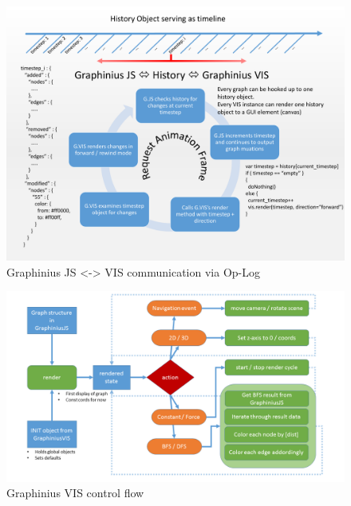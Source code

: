 	\begin{landscape}
		\begin{figure}[ht]
			\label{fig_history_workflow}
			\centering
			\vspace{-2.0cm}
			\includegraphics[width=1.6\textwidth]{figures/History_Workflow_pdf}
			\caption{Graphinius JS <-> VIS communication via Op-Log}
		\end{figure}
	\end{landscape}
	
	\begin{landscape}
		\begin{figure}[ht]
			\label{fig_vis_control_flow}
			\hspace*{-1cm}
			\includegraphics[width=1.9\textwidth]{figures/VIS_Control_Flow}
			\caption{Graphinius VIS control flow}
		\end{figure}
	\end{landscape}


